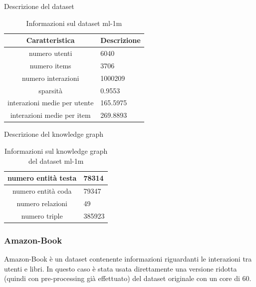 \noindent Descrizione del dataset
\begin{table}[H]
    \centering
    \footnotesize
    \begin{tabularx}{\textwidth}{|c|X|}
        \hline
        \textbf{Caratteristica} & \textbf{Descrizione} \\
        \hline
        numero utenti & 6040 \\
        \hline
        numero items & 3706 \\
        \hline
        numero interazioni & 1000209 \\
        \hline
        sparsità & 0.9553 \\
        \hline
        interazioni medie per utente & 165.5975 \\
        \hline
        interazioni medie per item & 269.8893 \\
        \hline
    \end{tabularx}
    \caption{Informazioni sul dataset ml-1m}
    \label{tab:dataset_info}
\end{table}

\noindent Descrizione del knowledge graph
\begin{table}[H]
    \centering
    \footnotesize
    \begin{tabularx}{\textwidth}{|c|X|}
        \hline
        numero entità testa & 78314 \\
        \hline
        numero entità coda & 79347 \\
        \hline
        numero relazioni & 49 \\
        \hline
        numero triple & 385923 \\
        \hline
    \end{tabularx}
    \caption{Informazioni sul knowledge graph del dataset ml-1m}
    \label{tab:dataset_info}
\end{table}


\subsubsection{Amazon-Book}

\noindent Amazon-Book è un dataset contenente informazioni riguardanti le interazioni tra utenti e libri.
In questo caso è stata usata direttamente una versione ridotta (quindi con pre-processing già effettuato) del dataset originale con un core di 60.

